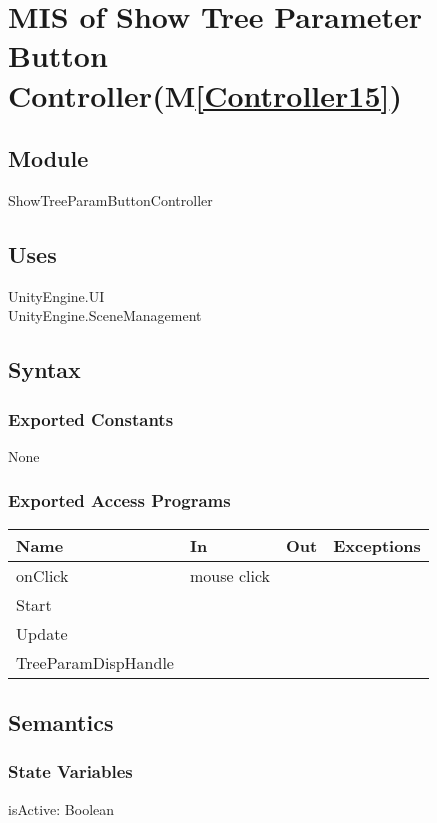 \documentclass[12pt, titlepage]{article}
\newcommand{\mref}[1]{M\ref{#1}}
\begin{document}
\section{MIS of Show Tree Parameter Button Controller(\mref{Controller15})}  

\subsection{Module}

ShowTreeParamButtonController

\subsection{Uses}
UnityEngine.UI\\
UnityEngine.SceneManagement\\

\subsection{Syntax}

\subsubsection{Exported Constants}
None
\subsubsection{Exported Access Programs}

\begin{center}
\begin{tabular}{| l | l | l | p{5cm}|}
\hline
\textbf{Name} & \textbf{In} & \textbf{Out} & \textbf{Exceptions} \\
\hline
onClick & mouse click &  &  \\
\hline
Start &&&\\
\hline
Update &&&\\
\hline
TreeParamDispHandle &&&\\
\hline
\end{tabular}
\end{center}

\subsection{Semantics}

\subsubsection{State Variables}
isActive: Boolean
\end{document}

